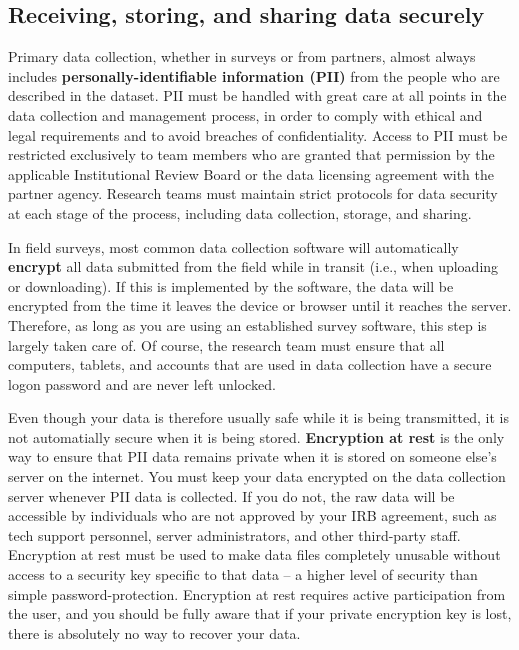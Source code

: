 \subsection{Receiving, storing, and sharing data securely}

Primary data collection, whether in surveys or from partners,
almost always includes \textbf{personally-identifiable information (PII)}
from the people who are described in the dataset.
PII must be handled with great care at all points in the data collection and management process,
in order to comply with ethical and legal requirements
and to avoid breaches of confidentiality.
Access to PII must be restricted exclusively to team members
who are granted that permission by the applicable Institutional Review Board
or the data licensing agreement with the partner agency.
Research teams must maintain strict protocols for data security at each stage of the process,
including data collection, storage, and sharing.

In field surveys, most common data collection software will automatically \textbf{encrypt}
all data submitted from the field while in transit (i.e., when uploading or downloading).
If this is implemented by the software,
the data will be encrypted from the time it leaves the device or browser until it reaches the server.
Therefore, as long as you are using an established survey software, this step is largely taken care of.
Of course, the research team must ensure that all computers, tablets, and accounts
that are used in data collection have a secure logon password and are never left unlocked.

Even though your data is therefore usually safe while it is being transmitted,
it is not automatially secure when it is being stored.
\textbf{Encryption at rest} is the only way to ensure
that PII data remains private when it is stored on someone else's server on the internet.
You must keep your data encrypted on the data collection server whenever PII data is collected.
If you do not, the raw data will be accessible by individuals
who are not approved by your IRB agreement,
such as tech support personnel, server administrators, and other third-party staff.
Encryption at rest must be used to make data files completely unusable
without access to a security key specific to that data
-- a higher level of security than simple password-protection.
Encryption at rest requires active participation from the user,
and you should be fully aware that if your private encryption key is lost,
there is absolutely no way to recover your data.

